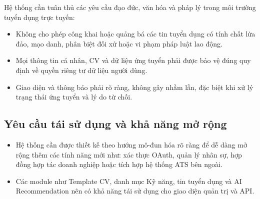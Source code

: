 Hệ thống cần tuân thủ các yêu cầu đạo đức, văn hóa và pháp lý trong môi trường tuyển dụng trực tuyến:

\begin{itemize}
    \item Không cho phép công khai hoặc quảng bá các tin tuyển dụng có tính chất lừa đảo, mạo danh, phân biệt đối xử hoặc vi phạm pháp luật lao động.
    \item Mọi thông tin cá nhân, CV và dữ liệu ứng tuyển phải được bảo vệ đúng quy định về quyền riêng tư dữ liệu người dùng.
    \item Giao diện và thông báo phải rõ ràng, không gây nhầm lẫn, đặc biệt khi xử lý trạng thái ứng tuyển và lý do từ chối.
\end{itemize}

\subsection{Yêu cầu tái sử dụng và khả năng mở rộng}

\begin{itemize}
    \item Hệ thống cần được thiết kế theo hướng mô-đun hóa rõ ràng để dễ dàng mở rộng thêm các tính năng mới như: xác thực OAuth, quản lý nhân sự, hợp đồng hợp tác doanh nghiệp hoặc tích hợp hệ thống ATS bên ngoài.
    \item Các module như Template CV, danh mục Kỹ năng, tin tuyển dụng và AI Recommendation nên có khả năng tái sử dụng cho giao diện quản trị và API.
\end{itemize}
